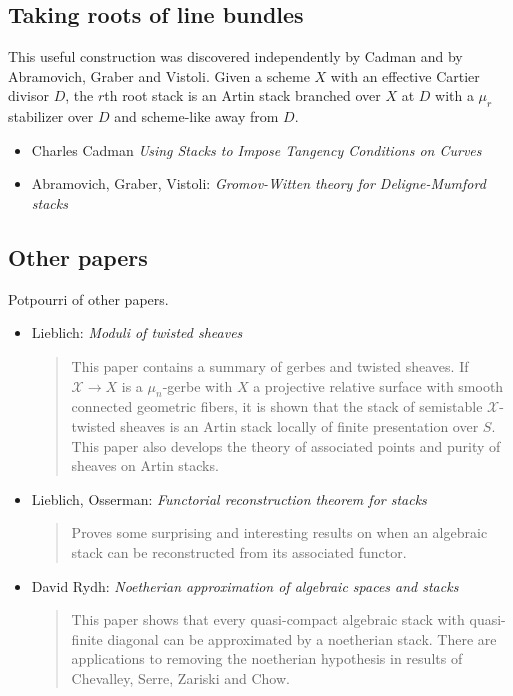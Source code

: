\subsection{Taking roots of line bundles}
\label{subsection-root-stacks}

\noindent
This useful construction was discovered independently by Cadman and by
Abramovich, Graber and Vistoli. Given a scheme $X$ with an effective Cartier
divisor $D$, the $r$th root stack is an Artin stack branched over $X$ at $D$
with a $\mu_r$ stabilizer over $D$ and scheme-like away from $D$.
\begin{itemize}
\item Charles Cadman
\emph{Using Stacks to Impose Tangency Conditions on Curves}
\cite{cadman}
\item Abramovich, Graber, Vistoli: \emph{Gromov-Witten theory for
Deligne-Mumford stacks} \cite{agv}
\end{itemize}

\subsection{Other papers}
\label{subsection-other}

\noindent
Potpourri of other papers.
\begin{itemize}
\item Lieblich: \emph{Moduli of twisted sheaves} \cite{lieblich_twisted}
\begin{quote}
This paper contains a summary of gerbes and twisted sheaves.
If $\mathcal{X} \rightarrow X$ is a $\mu_n$-gerbe with $X$ a projective
relative surface with smooth connected geometric fibers, it is shown that
the stack of semistable $\mathcal{X}$-twisted sheaves is an Artin stack
locally of finite presentation over $S$. This paper also develops the
theory of associated points and purity of sheaves on Artin stacks.
\end{quote}
\item Lieblich, Osserman:
\emph{Functorial reconstruction theorem for stacks}
\cite{lieblich-osserman}
\begin{quote}
Proves some surprising and interesting results on
when an algebraic stack can be reconstructed from its associated functor.
\end{quote}
\item David Rydh:
\emph{Noetherian approximation of algebraic spaces and stacks}
\cite{rydh_approx}
\begin{quote}
This paper shows that every quasi-compact algebraic stack
with quasi-finite diagonal can be approximated by a noetherian stack.
There are applications to removing the noetherian hypothesis in results
of Chevalley, Serre, Zariski and Chow.
\end{quote}
\end{itemize}




